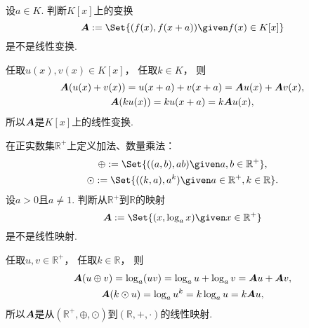 \begin{example}
设\(a \in K\).
判断\(K[x]\)上的变换\[
	\vb{A} \defeq \Set{
		(f(x),f(x+a))
		\given
		f(x) \in K[x]
	}
\]是不是线性变换.
\begin{solution}
任取\(u(x),v(x) \in K[x]\)，
任取\(k \in K\)，
则\begin{gather*}
	\boldsymbol{A}(u(x)+v(x))
	= u(x+a) + v(x+a)
	= \boldsymbol{A}u(x) + \boldsymbol{A}v(x), \\
	\boldsymbol{A}(k u(x))
	= k u(x+a)
	= k \boldsymbol{A}u(x),
\end{gather*}
所以\(\boldsymbol{A}\)是\(K[x]\)上的线性变换.
\end{solution}
\end{example}

\begin{example}
在正实数集\(\mathbb{R}^+\)上定义加法、数量乘法：\begin{gather*}
	\oplus \defeq \Set{
		((a,b),ab)
		\given
		a,b \in \mathbb{R}^+
	}, \\
	\odot \defeq \Set{
		((k,a),a^k)
		\given
		a \in \mathbb{R}^+,
		k \in \mathbb{R}
	}.
\end{gather*}
设\(a>0\)且\(a\neq1\).
判断从\(\mathbb{R}^+\)到\(\mathbb{R}\)的映射\[
	\vb{A} \defeq \Set{
		(x,\log_a x)
		\given
		x \in \mathbb{R}^+
	}
\]是不是线性映射.
\begin{solution}
任取\(u,v\in\mathbb{R}^+\)，
任取\(k\in\mathbb{R}\)，
则\begin{gather*}
	\boldsymbol{A}(u \oplus v)
	= \log_a (u v)
	= \log_a u + \log_a v
	= \boldsymbol{A}u + \boldsymbol{A}v, \\
	\boldsymbol{A}(k \odot u)
	= \log_a u^k
	= k \log_a u
	= k \boldsymbol{A}u,
\end{gather*}
所以\(\boldsymbol{A}\)是从\((\mathbb{R}^+,\oplus,\odot)\)到\((\mathbb{R},+,\cdot)\)的线性映射.
\end{solution}
\end{example}

